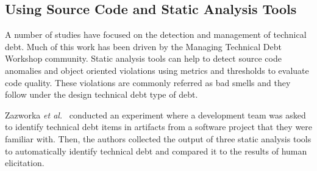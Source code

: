 \subsection{Using Source Code and Static Analysis Tools}

A number of studies have focused on the detection and management of technical debt. Much of this work has been driven by the Managing Technical Debt Workshop community. Static analysis tools can help to detect source code anomalies and object oriented violations using metrics and thresholds to evaluate code quality. These violations are commonly referred as bad smells and they follow under the design technical debt type of debt. 

Zazworka \textit{et al.}~\cite{Zazworka2013CSE} conducted an experiment where a development team was asked to identify technical debt items in artifacts from a software project that they were familiar with. Then, the authors collected the output of three static analysis tools to
automatically identify technical debt and compared it to the results of human elicitation.




